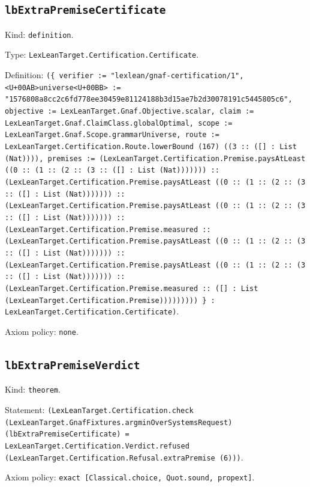 \documentclass[11pt]{article}
\begin{document}
\subsection*{\texttt{lbExtraPremiseCertificate}}
\noindent Kind: \texttt{definition}.\par
\noindent Type: \texttt{LexLeanTarget.Certification.Certificate}.\par
\noindent Definition: \texttt{(\{ verifier := "lexlean/gnaf-certification/1", <U+00AB>universe<U+00BB> := "1576808a8cc2c6fd778ee30459e81124188b3d15ae7b2d30078191c5445805c6", objective := LexLeanTarget.Gnaf.Objective.scalar, claim := LexLeanTarget.Gnaf.ClaimClass.globalOptimal, scope := LexLeanTarget.Gnaf.Scope.grammarUniverse, route := LexLeanTarget.Certification.Route.lowerBound (167) ((3 :: ([] : List (Nat)))), premises := (LexLeanTarget.Certification.Premise.paysAtLeast ((0 :: (1 :: (2 :: (3 :: ([] : List (Nat))))))) :: (LexLeanTarget.Certification.Premise.paysAtLeast ((0 :: (1 :: (2 :: (3 :: ([] : List (Nat))))))) :: (LexLeanTarget.Certification.Premise.paysAtLeast ((0 :: (1 :: (2 :: (3 :: ([] : List (Nat))))))) :: (LexLeanTarget.Certification.Premise.measured :: (LexLeanTarget.Certification.Premise.paysAtLeast ((0 :: (1 :: (2 :: (3 :: ([] : List (Nat))))))) :: (LexLeanTarget.Certification.Premise.paysAtLeast ((0 :: (1 :: (2 :: (3 :: ([] : List (Nat))))))) :: (LexLeanTarget.Certification.Premise.measured :: ([] : List (LexLeanTarget.Certification.Premise))))))))) \} : LexLeanTarget.Certification.Certificate)}.\par
\noindent Axiom policy: \texttt{none}.\par
\subsection*{\texttt{lbExtraPremiseVerdict}}
\noindent Kind: \texttt{theorem}.\par
\noindent Statement: \texttt{(LexLeanTarget.Certification.check (LexLeanTarget.GnafFixtures.argminOverSystemsRequest) (lbExtraPremiseCertificate) = LexLeanTarget.Certification.Verdict.refused (LexLeanTarget.Certification.Refusal.extraPremise (6)))}.\par
\noindent Axiom policy: \texttt{exact [Classical.choice, Quot.sound, propext]}.\par
\end{document}
